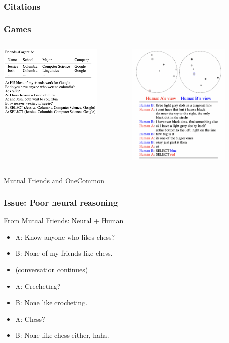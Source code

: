 \documentclass{beamer}
\begin{document}
\begin{frame}[allowframebreaks]
\frametitle{Citations}

\end{frame}

\begin{frame}
\frametitle{Games}

\begin{columns}
\begin{column}{0.5\textwidth}
\centering
\includegraphics[width=2in]{img/mf.png}
\end{column}
\begin{column}{0.5\textwidth}
\centering
\includegraphics[width=2in]{img/oc.png}
\end{column}
\end{columns}

\vspace{2em}
\centering
Mutual Friends and OneCommon
\end{frame}

\begin{frame}
\frametitle{Issue: Poor neural reasoning}
From Mutual Friends: Neural + Human
\begin{itemize}
\item A: Know anyone who likes chess?
\item B: None of my friends like chess.
\item (conversation continues)
\item A: Crocheting?
\item B: None like crocheting.
\item A: Chess?
\item B: None like chess either, haha.
\end{itemize}
\end{frame}
\end{document}
